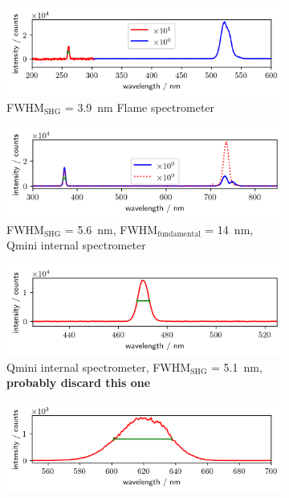 \documentclass[twoside,openright]{scrreprt}
\begin{document}
\begin{figure}[hbtp]
\begin{subfigure}[b]{\textwidth}
\centering
\includegraphics[scale=1]{images/spectra/SpectrumExampleNoFilter_260nm.png}
\caption{FWHM$_{\mathrm{SHG}}$ = \SI{3.9}{\nano\meter} Flame spectrometer}
\end{subfigure}
\begin{subfigure}[b]{\textwidth}
\centering
\includegraphics[scale=1]{images/spectra/SpectrumExampleNoFilter_371nm.png}
\caption{FWHM$_{\mathrm{SHG}}$ = \SI{5.6}{\nano\meter}, FWHM$_{\mathrm{fundamental}}$ = \SI{14}{\nano\meter}, Qmini internal spectrometer\label{fig:SHG_offCenterComp}}
\end{subfigure}
\begin{subfigure}[b]{\textwidth}
\centering
\includegraphics[scale=1]{images/spectra/SpectrumExampleNoFilter_470nm.png}
\caption{Qmini internal spectrometer, FWHM$_{\mathrm{SHG}}$ = \SI{5.1}{\nano\meter}, \textbf{probably discard this one}}
\end{subfigure}
\begin{subfigure}[b]{\textwidth}
\centering
\includegraphics[scale=1]{images/spectra/ActonMonochromatorCharacterisation/620nmSpectrumProbe.png}

\end{subfigure}
\end{figure}
\end{document}

